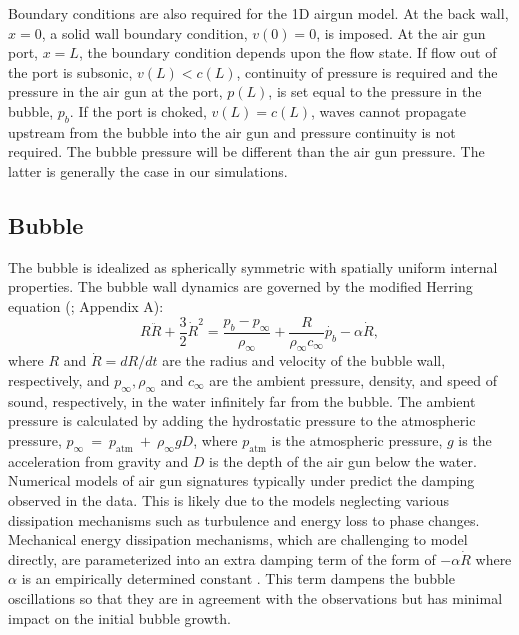 \documentclass[10pt]{article}
\begin{document}
Boundary conditions are also required for the 1D airgun model. At the back wall, $x=0$, a solid wall boundary condition, $v(0)=0$, is imposed. At the air gun port, $x=L$, the boundary condition depends upon the flow state. If flow out of the port is subsonic, $v(L)<c(L)$, continuity of pressure is required and the pressure in the air gun at the port, $p(L)$, is set equal to the pressure in the bubble, $p_b$. If the port is choked, $v(L)=c(L)$, waves cannot propagate upstream from the bubble into the air gun and pressure continuity is not required. The bubble pressure will be different than the air gun pressure. The latter is generally the case in our simulations.



\subsection{Bubble}
The bubble is idealized as spherically symmetric with spatially uniform internal properties. The bubble wall dynamics are governed by the modified Herring equation (\citealp{Herring1941,Cole1948,Vokurka1986}; Appendix A):
\begin{equation}
R \ddot{R}+ \frac{3}{2} \dot{R}^2 = \frac{p_b - p_\infty}{\rho_\infty} + \frac{R}{\rho_\infty c_\infty} \dot{p_b} - \alpha \dot{R},
\label{eq:modified herring}
\end{equation}
where $R$ and $\dot{R}=dR/dt$ are the radius and velocity of the bubble wall, respectively, and $p_\infty, \rho_\infty$ and $c_\infty$ are the ambient pressure, density, and speed of sound, respectively, in the water infinitely far from the bubble. The ambient pressure is calculated by adding the hydrostatic pressure to the atmospheric pressure, $p_\infty~=~p_\text{atm}~+~\rho_\infty g D$, where $p_\text{atm}$ is the atmospheric pressure, $g$ is the acceleration from gravity and $D$ is the depth of the air gun below the water. Numerical models of air gun signatures typically under predict the damping observed in the data. This is likely due to the models neglecting various dissipation mechanisms such as turbulence and energy loss to phase changes. Mechanical energy dissipation mechanisms, which are challenging to model directly, are parameterized into an extra damping term of the form of $-\alpha \dot{R}$ where $\alpha$ is an empirically determined constant \citep{Langhammer1996, Watson2017}. This term dampens the bubble oscillations so that they are in agreement with the observations but has minimal impact on the initial bubble growth. 
\end{document}
